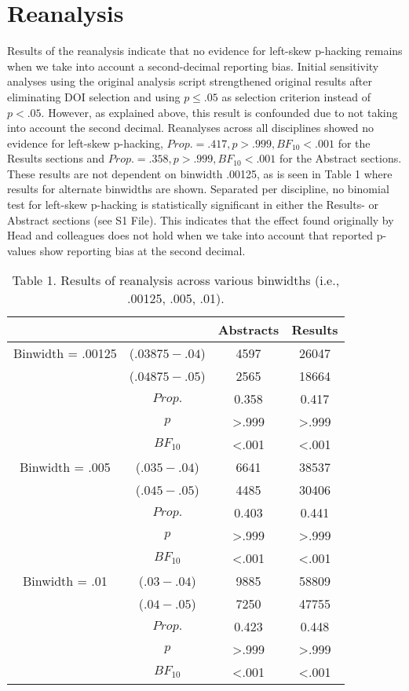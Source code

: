 \section*{Reanalysis}
Results of the reanalysis indicate that no evidence for left-skew p-hacking remains when we take into account a second-decimal reporting bias. Initial sensitivity analyses using the original analysis script strengthened original results after eliminating DOI selection and using $p\leq.05$ as selection criterion instead of $p<.05$. However, as explained above, this result is confounded due to not taking into account the second decimal. Reanalyses across all disciplines showed no evidence for left-skew p-hacking, $Prop.=.417,p>.999, BF_{10}<.001$ for the Results sections and $Prop.=.358,p>.999,BF_{10}<.001$ for the Abstract sections. These results are not dependent on binwidth .00125, as is seen in Table 1 where results for alternate binwidths are shown.  Separated per discipline, no binomial test for left-skew p-hacking is statistically significant in either the Results- or Abstract sections (see S1 File). This indicates that the effect found originally by Head and colleagues does not hold when we take into account that reported p-values show reporting bias at the second decimal.

\begin{table}[htbp]
    \begin{tabular}{cccc}
              &       & Abstracts & Results \\
              \hline
      Binwidth = .00125 & ($.03875-.04$) & 4597  & 26047 \\
          & ($.04875-.05$) & 2565  & 18664 \\
          & $Prop.$ & 0.358 & 0.417 \\
          & $p$     & >.999 & >.999 \\
          & $BF_{10}$  & <.001 & <.001 \\
    Binwidth = .005 & ($.035-.04$) & 6641  & 38537 \\
          & ($.045-.05$) & 4485  & 30406 \\
          & $Prop.$ & 0.403 & 0.441 \\
          & $p$     & >.999 & >.999 \\
          & $BF_{10}$  & <.001 & <.001 \\
    Binwidth = .01 & ($.03-.04$) & 9885  & 58809 \\
          & ($.04-.05$) & 7250  & 47755 \\
          & $Prop.$ & 0.423 & 0.448 \\
          & $p$     & >.999 & >.999 \\
          & $BF_{10}$  & <.001 & <.001 \\

    \end{tabular}
    \caption{Table 1. Results of reanalysis across various binwidths (i.e., .00125, .005, .01).} 
\end{table}
  